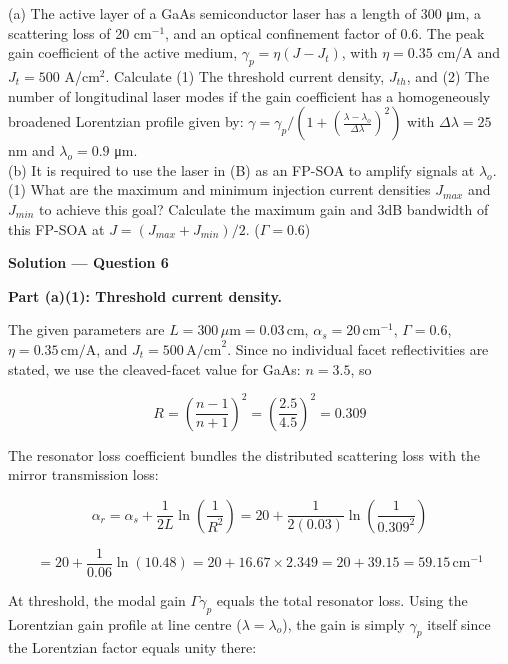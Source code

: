 \begin{question}[Question 6]
(a) The active layer of a GaAs semiconductor laser has a length of 300 \si{\micro\meter}, a scattering loss of 20 cm$^{-1}$, and an optical confinement factor of 0.6. The peak gain coefficient of the active medium, $\gamma_p = \eta(J - J_t)$, with $\eta = 0.35$ cm/A and $J_t = 500$ A/cm$^2$. Calculate (1) The threshold current density, $J_{th}$, and (2) The number of longitudinal laser modes if the gain coefficient has a homogeneously broadened Lorentzian profile given by: $\gamma = \gamma_p / \left(1 + \left(\frac{\lambda - \lambda_o}{\Delta\lambda}\right)^2\right)$ with $\Delta\lambda = 25$ nm and $\lambda_o = 0.9$ \si{\micro\meter}.\\
(b) It is required to use the laser in (B) as an FP-SOA to amplify signals at $\lambda_o$. (1) What are the maximum and minimum injection current densities $J_{max}$ and $J_{min}$ to achieve this goal? Calculate the maximum gain and 3dB bandwidth of this FP-SOA at $J = (J_{max} + J_{min})/2$. ($\Gamma = 0.6$)
\end{question}

\textbf{\large Solution --- Question 6}

\textbf{Part (a)(1): Threshold current density.}

The given parameters are $L = 300\,\mu\text{m} = 0.03\,\text{cm}$, $\alpha_s = 20\,\text{cm}^{-1}$, $\Gamma = 0.6$, $\eta = 0.35\,\text{cm/A}$, and $J_t = 500\,\text{A/cm}^2$. Since no individual facet reflectivities are stated, we use the cleaved-facet value for GaAs: $n = 3.5$, so

\begin{equation*}
  R = \left(\frac{n-1}{n+1}\right)^2 = \left(\frac{2.5}{4.5}\right)^2 = 0.309
\end{equation*}

The resonator loss coefficient bundles the distributed scattering loss with the mirror transmission loss:

\begin{equation*}
  \alpha_r = \alpha_s + \frac{1}{2L}\ln\!\left(\frac{1}{R^2}\right) = 20 + \frac{1}{2(0.03)}\ln\!\left(\frac{1}{0.309^2}\right)
\end{equation*}

\begin{equation*}
  = 20 + \frac{1}{0.06}\ln(10.48) = 20 + 16.67 \times 2.349 = 20 + 39.15 = 59.15\,\text{cm}^{-1}
\end{equation*}

At threshold, the modal gain $\Gamma\gamma_p$ equals the total resonator loss. Using the Lorentzian gain profile at line centre ($\lambda = \lambda_o$), the gain is simply $\gamma_p$ itself since the Lorentzian factor equals unity there:

